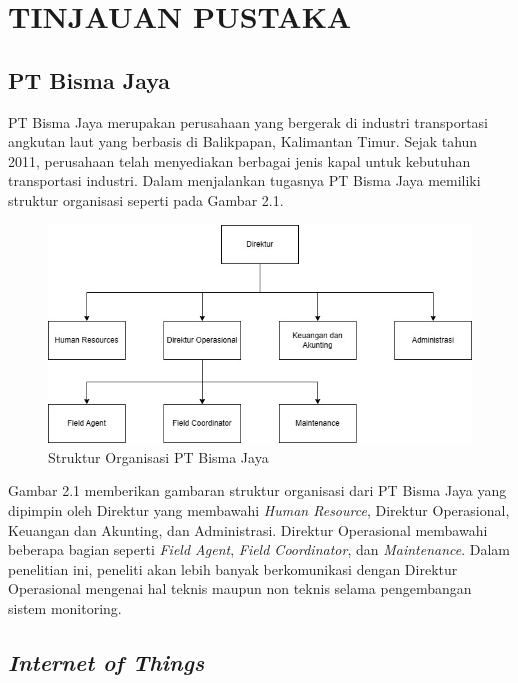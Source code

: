 \chapter{TINJAUAN PUSTAKA}

\section{PT Bisma Jaya}

\noindent PT Bisma Jaya merupakan perusahaan yang bergerak di industri transportasi angkutan laut yang berbasis di Balikpapan, Kalimantan Timur. Sejak tahun 2011, perusahaan telah menyediakan berbagai jenis kapal untuk kebutuhan transportasi industri. Dalam menjalankan tugasnya PT Bisma Jaya memiliki struktur organisasi seperti pada Gambar 2.1.

\begin{figure}[!h]
    \includegraphics[width=1\linewidth, center]{images/tinjauan-pustaka/fig-org-structure.jpg}
    \caption{Struktur Organisasi PT Bisma Jaya}
    \label{fig:org-structure}
\end{figure}

Gambar 2.1 memberikan gambaran struktur organisasi dari PT Bisma Jaya yang dipimpin oleh Direktur yang membawahi \textit{Human Resource}, Direktur Operasional, Keuangan dan Akunting, dan Administrasi. Direktur Operasional membawahi beberapa bagian seperti \textit{Field Agent}, \textit{Field Coordinator}, dan \textit{Maintenance}. Dalam penelitian ini, peneliti akan lebih banyak berkomunikasi dengan Direktur Operasional mengenai hal teknis maupun non teknis selama pengembangan sistem monitoring. 

\section{\textit{Internet of Things}}

